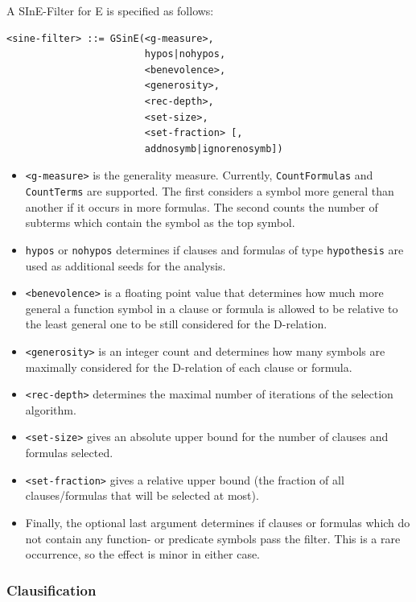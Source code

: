 \documentclass{report}
\begin{document}
\begin{itemize}
  A SInE-Filter for E is specified as follows:
\begin{verbatim}
<sine-filter> ::= GSinE(<g-measure>,
                        hypos|nohypos,
                        <benevolence>,
                        <generosity>,
                        <rec-depth>,
                        <set-size>,
                        <set-fraction> [,
                        addnosymb|ignorenosymb])
\end{verbatim}
  \begin{itemize}
  \item \texttt{<g-measure>} is the generality measure. Currently,
    \texttt{CountFormulas} and \texttt{CountTerms} are supported. The
    first considers a symbol more general than another if it occurs
    in more formulas. The second counts the number of subterms which
    contain the symbol as the top symbol.
  \item \texttt{hypos} or \texttt{nohypos} determines if clauses and
    formulas of type \texttt{hy\-po\-the\-sis} are used as additional seeds
    for the analysis.
  \item \texttt{<benevolence>} is a floating point value that determines
    how much more general a function symbol in a clause or formula is
    allowed to be relative to the least general one to be still
    considered for the D-relation.
  \item \texttt{<generosity>} is an integer count and determines how
    many symbols are maximally considered for the D-relation of each
    clause or formula.
  \item \texttt{<rec-depth>} determines the maximal number of
    iterations of the selection algorithm.
  \item \texttt{<set-size>} gives an absolute upper bound for the
    number of clauses and formulas selected.
  \item \texttt{<set-fraction>} gives a relative upper bound (the
    fraction of all clauses/formulas that will be selected at most).
  \item Finally, the optional last argument determines if clauses or
    formulas which do not contain any function- or predicate symbols
    pass the filter. This is a rare occurrence, so the effect is minor
    in either case.
  \end{itemize}
\end{itemize}

\subsubsection{Clausification}
\label{sec:cnf}
\end{document}
